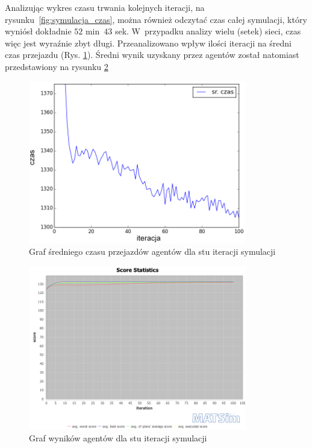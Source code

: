 \documentclass[twoside,12pt]{report}
\begin{document}
Analizując wykres czasu trwania kolejnych iteracji, na rysunku~\ref{fig:symulacja_czas}, można również odczytać czas całej symulacji, który wyniósł dokładnie $52$ min~$43$ sek.  W~przypadku analizy wielu (setek) sieci, czas więc jest wyraźnie zbyt długi. Przeanalizowano wpływ ilości iteracji na średni czas przejazdu (Rys. \ref{fig:iteracje_czas}). Średni wynik uzyskany przez agentów został natomiast przedstawiony na rysunku \ref{fig:iteracje_wynik}

\begin{figure}[htbp]
	\centering
	\includegraphics[width=0.85\textwidth]{img/def_iters}
	\caption{Graf średniego czasu przejazdów agentów dla stu iteracji symulacji}
	\label{fig:iteracje_czas}
\end{figure}

\begin{figure}[htbp]
	\centering
	\includegraphics[width=0.85\textwidth]{img/def_scorestats}
	\caption{Graf wyników agentów dla stu iteracji symulacji}
	\label{fig:iteracje_wynik}
\end{figure}
\end{document}
